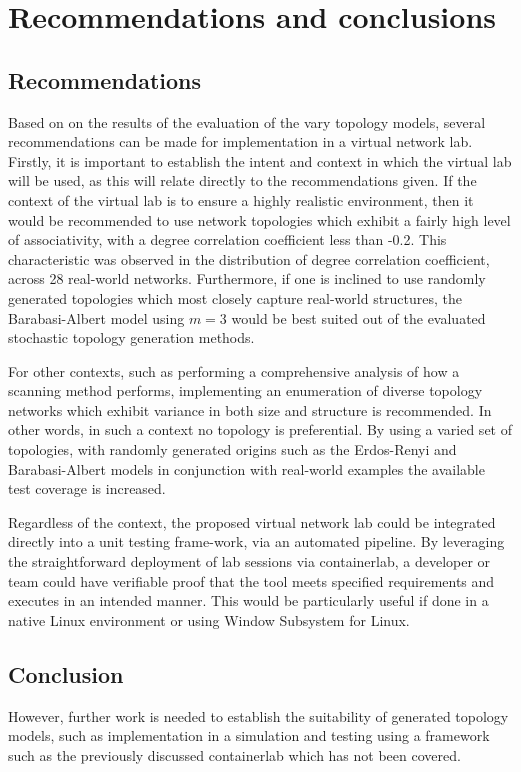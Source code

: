 \section{Recommendations and conclusions}

\subsection{Recommendations}
Based on on the results of the evaluation of the vary topology models, several recommendations can be made for implementation in a virtual network lab. Firstly, it is important to establish the intent and context in which the virtual lab will be used, as this will relate directly to the recommendations given. If the context of the virtual lab is to ensure a highly realistic environment, then it would be recommended to use network topologies which exhibit a fairly high level of associativity, with a degree correlation coefficient less than -0.2. This characteristic was observed in the distribution of degree correlation coefficient, across 28 real-world networks. Furthermore, if one is inclined to use randomly generated topologies which most closely capture real-world structures, the Barabasi-Albert model using $m=3$ would be best suited out of the evaluated stochastic topology generation methods.

For other contexts, such as performing a comprehensive analysis of how a scanning method performs, implementing an enumeration of diverse topology networks which exhibit variance in both size and structure is recommended. In other words, in such a context no topology is preferential. By using a varied set of topologies, with randomly generated origins such as the Erdos-Renyi and Barabasi-Albert models in conjunction with real-world examples the available test coverage is increased. 

Regardless of the context, the proposed virtual network lab could be integrated directly into a unit testing frame-work, via an automated pipeline. By leveraging the straightforward deployment of lab sessions via containerlab, a developer or team could have verifiable proof that the tool meets specified requirements and executes in an intended manner. This would be particularly useful if done in a native Linux environment or using Window Subsystem for Linux\cite{wsl}.

\subsection{Conclusion}

 However, further work is needed to establish the suitability of generated topology models, such as implementation in a simulation and testing using a framework such as the previously discussed containerlab \cite{containerlab} which has not been covered. 